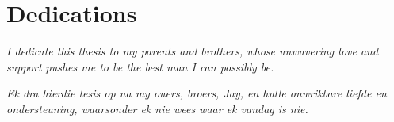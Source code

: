 \chapter{Dedications}%

\vfill
\begin{center}\itshape%
  I dedicate this thesis to my parents and brothers, whose unwavering love and support pushes me to be the best man I can possibly be. 
\end{center}
\vfill

\vfill
\begin{Afr}
  \begin{center}\itshape%
    Ek dra hierdie tesis op na my ouers, broers, Jay, en hulle onwrikbare liefde en ondersteuning, waarsonder ek nie wees waar ek vandag is nie. 
  \end{center}
\end{Afr}
\vfill
\clearpage
	   
\endinput
